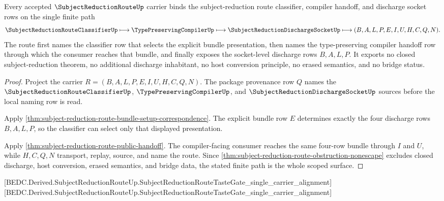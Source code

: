 \begin{theorem}
\label{thm:subject-reduction-route-finite-route-surface}
Every accepted $\SubjectReductionRouteUp$ carrier binds the subject-reduction route classifier, compiler handoff, and discharge socket rows on the single finite path
$$
\SubjectReductionRouteClassifierUp \longmapsto \TypePreservingCompilerUp \longmapsto \SubjectReductionDischargeSocketUp \longmapsto (B,A,L,P,E,I,U,H,C,Q,N).
$$
The route first names the classifier row that selects the explicit bundle presentation, then names the type-preserving compiler handoff row through which the consumer reaches that bundle, and finally exposes the socket-level discharge rows $B,A,L,P$. It exports no closed subject-reduction theorem, no additional discharge inhabitant, no host conversion principle, no erased semantics, and no bridge status.
\end{theorem}
\begin{proof}
Project the carrier $R=(B,A,L,P,E,I,U,H,C,Q,N)$. The package provenance row $Q$ names the $\SubjectReductionRouteClassifierUp$, $\TypePreservingCompilerUp$, and $\SubjectReductionDischargeSocketUp$ sources before the local naming row is read.

Apply \autoref{thm:subject-reduction-route-bundle-setup-correspondence}. The explicit bundle row $E$ determines exactly the four discharge rows $B,A,L,P$, so the classifier can select only that displayed presentation.

Apply \autoref{thm:subject-reduction-route-public-handoff}. The compiler-facing consumer reaches the same four-row bundle through $I$ and $U$, while $H,C,Q,N$ transport, replay, source, and name the route. Since \autoref{thm:subject-reduction-route-obstruction-nonescape} excludes closed discharge, host conversion, erased semantics, and bridge data, the stated finite path is the whole scoped surface.
\end{proof}

[BEDC.Derived.SubjectReductionRouteUp.SubjectReductionRouteTasteGate\_single\_carrier\_alignment]
[BEDC.Derived.SubjectReductionRouteUp.SubjectReductionRouteTasteGate\_single\_carrier\_alignment]

